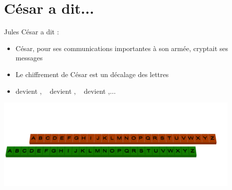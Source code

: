 \section{César a dit...}

\begin{frame}

Jules César a dit : \\
\centerline{}

\pause

\begin{itemize}
  \item César, pour ses communications importantes à son armée, cryptait ses messages
\pause  
  \item Le chiffrement de César est un décalage des lettres
\pause  
  \item {} devient , \  devient , \  devient ,...
\end{itemize}

\vspace*{-3ex}
\pause

\centerline{\includegraphics[width=0.9\textwidth]{figures/Cesar_plan_3.png}}


\end{frame}


